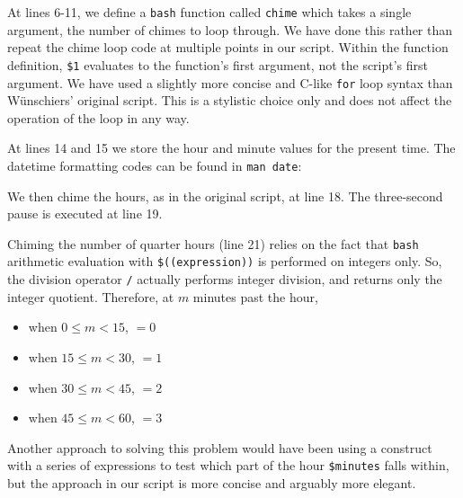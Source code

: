 \documentclass{article}
\begin{document}
At lines 6-11, we define a \texttt{bash} function called \texttt{chime} which takes a single argument, the number of chimes to loop through. We have done this rather than repeat the chime loop code at multiple points in our script. Within the function definition, \texttt{\$1} evaluates to the function's first argument, not the script's first argument. We have used a slightly more concise and C-like \texttt{for} loop syntax than Wünschiers' original script. This is a stylistic choice only and does not affect the operation of the loop in any way.

At lines 14 and 15 we store the hour and minute values for the present time. The datetime formatting codes can be found in \texttt{man date}:

\begin{bashinline}
\end{bashinline}

We then chime the hours, as in the original script, at line 18. The three-second pause is executed at line 19.

Chiming the number of quarter hours (line 21) relies on the fact that \texttt{bash} arithmetic evaluation with \texttt{\$((expression))} is performed on integers only. So, the division operator \texttt{/} actually performs integer division, and returns only the integer quotient. Therefore, at $m$ minutes past the hour,
\begin{itemize}
    \item when $0 \leq m < 15$,  $= 0$
    \item when $15 \leq m < 30$,  $= 1$
    \item when $30 \leq m < 45$,  $= 2$
    \item when $45 \leq m < 60$,  $= 3$
\end{itemize}

Another approach to solving this problem would have been using a  construct with a series of expressions to test which part of the hour \texttt{\$minutes} falls within, but the approach in our script is more concise and arguably more elegant.
\end{document}
